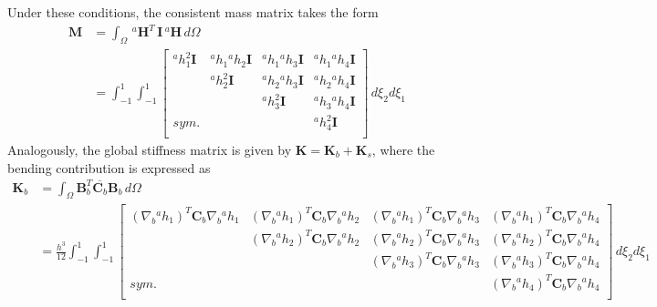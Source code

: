 \documentclass[12pt]{article}
\begin{document}
Under these conditions, the consistent mass matrix takes the form
\begin{align*}
    \mathbf M & =\int_{\Omega}\, {}^a\mathbf H^T\, \mathbf I\, {}^a\mathbf H \, d\Omega                                                               \\
              & = \int_{-1}^1\int_{-1}^1 \begin{bmatrix}
                                             {}^a h_1^2 \mathbf I & {}^a h_1{}^a h_2 \mathbf I & {}^a h_1{}^a h_3 \mathbf I & {}^a h_1{}^a h_4 \mathbf I  \\
                                                                  & {}^a h_2^2 \mathbf I       & {}^a h_2{}^a h_3 \mathbf I & {}^a h_2{}^a h_4 \mathbf I  \\
                                                                  &                            & {}^a h_3^2 \mathbf I       & {}^a h_3 {}^a h_4 \mathbf I \\
                                             sym.                 &                            &                            & {}^a h_4^2 \mathbf I        \\
                                         \end{bmatrix} \, d\xi_2d\xi_1
\end{align*}
Analogously, the global stiffness matrix is given by $\mathbf{K} = \mathbf{K}_b + \mathbf{K}_s$, where the bending contribution is expressed as
\begin{align*}
    \mathbf K_b & =\int_{\Omega}\mathbf B_b^T\overline{\boldsymbol{C}_b}\mathbf B_b\, d\Omega                                                                                                                                                                        \\
                & =\frac{h^3}{12}\int_{-1}^1\int_{-1}^1\begin{bmatrix}
                                                           (\nabla_b{}^a h_1)^T \mathbf C_b \nabla_b{}^a h_1 & (\nabla_b{}^a h_1)^T \mathbf C_b \nabla_b{}^a h_2 & (\nabla_b{}^a h_1)^T \mathbf C_b \nabla_b{}^a h_3 & (\nabla_b{}^a h_1)^T\mathbf C_b \nabla_b{}^a h_4  \\
                                                                                                             & (\nabla_b{}^a h_2)^T \mathbf C_b \nabla_b{}^a h_2 & (\nabla_b{}^a h_2)^T \mathbf C_b \nabla_b{}^a h_3 & (\nabla_b{}^a h_2)^T \mathbf C_b \nabla_b{}^a h_4 \\
                                                                                                             &                                                   & (\nabla_b{}^a h_3)^T \mathbf C_b \nabla_b{}^a h_3 & (\nabla_b{}^a h_3)^T\mathbf C_b \nabla_b{}^a h_4  \\
                                                           sym.                                              &                                                   &                                                   & (\nabla_b{}^a h_4)^T \mathbf C_b \nabla_b{}^a h_4 \\
                                                       \end{bmatrix} \, d\xi_2d\xi_1
\end{align*}
\end{document}
